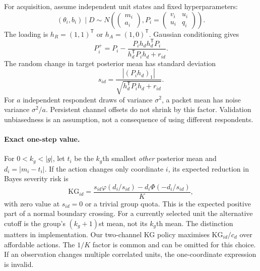 For acquisition, assume independent unit states and fixed hyperparameters:
\begin{equation}
 (\theta_i,b_i)\mid D\sim N\left(\begin{pmatrix}m_i\\a_i\end{pmatrix},
 P_i=\begin{pmatrix}v_i&u_i\\u_i&q_i\end{pmatrix}\right).
\end{equation}
The loading is $h_R=(1,1)^\mathsf T$ or $h_A=(1,0)^\mathsf T$. Gaussian conditioning gives
\[P_i^+=P_i-\frac{P_ih_dh_d^\mathsf TP_i}{h_d^\mathsf TP_ih_d+r_{id}}.\] The random change in target posterior mean has standard deviation
\begin{equation}
 s_{id}=\frac{|(P_ih_d)_1|}{\sqrt{h_d^\mathsf TP_ih_d+r_{id}}}.
 \label{eq:sdmain}
\end{equation}
For $a$ independent respondent draws of variance $\sigma^2$, a packet mean has noise variance $\sigma^2/a$. Persistent channel offsets do not shrink by this factor. Validation unbiasedness is an assumption, not a consequence of using different respondents.

\paragraph{Exact one-step value.}
For $0<k_g<|g|$, let $t_i$ be the $k_g$th smallest \emph{other} posterior mean and $d_i=|m_i-t_i|$. If the action changes only coordinate $i$, its expected reduction in Bayes severity risk is
\begin{equation}
 \mathrm{KG}_{id}=\frac{s_{id}\varphi(d_i/s_{id})-d_i\Phi(-d_i/s_{id})}{K},
 \label{eq:kgmain}
\end{equation}
with zero value at $s_{id}=0$ or a trivial group quota. This is the expected positive part of a normal boundary crossing. For a currently selected unit the alternative cutoff is the group's $(k_g+1)$st mean, not its $k_g$th mean. The distinction matters in implementation. Our two-channel KG policy maximises $\mathrm{KG}_{id}/c_d$ over affordable actions. The $1/K$ factor is common and can be omitted for this choice. If an observation changes multiple correlated units, the one-coordinate expression is invalid.

